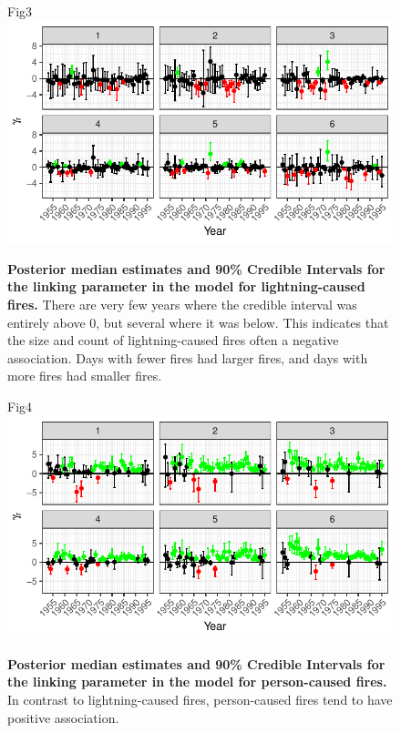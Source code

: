 \documentclass[10pt,letterpaper]{article}
\begin{document}
\begin{figure}[h!]
\centering
Fig3
\includegraphics[width=\textwidth]{Joint_Count_Files/gammaltg-1.pdf}
\caption{\label{gammaltg}\textbf{Posterior median estimates and 90\% Credible
Intervals for the linking parameter in the model for lightning-caused
fires.} There are very few years where the credible interval was entirely
above 0, but several where it was below. This indicates that the size and
count of lightning-caused fires often a negative association.
Days with fewer fires had larger fires, and days with more fires had
smaller fires.}
\end{figure}

\begin{figure}[h!]
\centering
Fig4
\includegraphics[width=\textwidth]{Joint_Count_Files/gammaper-1.pdf}
\caption{\label{gammaper}\textbf{Posterior median estimates and 90\% Credible
Intervals for the linking parameter in the model for person-caused
fires.} In contrast to lightning-caused fires, person-caused fires tend
to have positive association.}
\end{figure}
\end{document}
